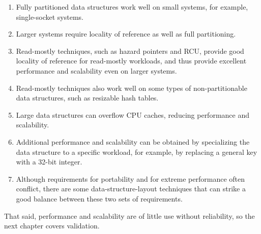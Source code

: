 \begin{enumerate}
\item	Fully partitioned data structures work well on small systems,
	for example, single-socket systems.
\item	Larger systems require locality of reference as well as
	full partitioning.
\item	Read-mostly techniques, such as hazard pointers and RCU,
	provide good locality of reference for read-mostly workloads,
	and thus provide excellent performance and scalability even
	on larger systems.
\item	Read-mostly techniques also work well on some types of
	non-partitionable data structures, such as resizable hash tables.
\item	Large data structures can overflow CPU caches, reducing performance
	and scalability.
\item	Additional performance and scalability can be obtained by
	specializing the data structure to a specific workload,
	for example, by replacing a general key with a 32-bit integer.
\item	Although requirements for portability and for extreme performance
	often conflict, there are some data-structure-layout techniques
	that can strike a good balance between these two sets of
	requirements.
\end{enumerate}

That said, performance and scalability are of little use without reliability,
so the next chapter covers validation.

